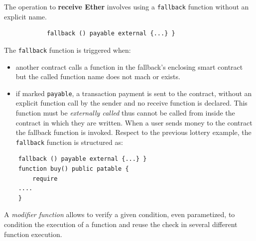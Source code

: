 \documentclass[10pt,a4paper]{report}
\begin{document}
	The operation to \textbf{receive Ether} involves using a \texttt{fallback} function without an explicit name.
	\begin{lstlisting}
			fallback () payable external {...} }
	\end{lstlisting}

The \texttt{fallback} function is triggered when:
\begin{itemize}
	\item 
	another contract calls a function in the fallback's enclosing smart contract but the called function name does not mach or exists.
	\item 
	if marked \texttt{payable}, a transaction payment is sent to the contract, without an explicit function call by the sender and no receive function is declared.
	This function must be \textit{externally called} thus cannot be called from inside the contract in which they are written. When a user sends money to the contract the fallback function is invoked.
	Respect to the previous lottery example, the \texttt{fallback} function is structured as:
\end{itemize}
\begin{lstlisting}
	fallback () payable external {...} }
	function buy() public patable {
		require
	....
	}
\end{lstlisting}



A \textit{modifier function} allows to verify a given condition, even parametized, to condition the execution of a function and reuse the check in several different function execution.
\end{document}

